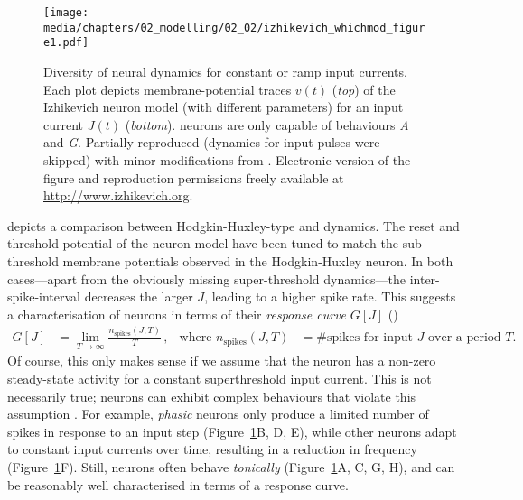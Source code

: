 \begin{figure}
	\centering
	\texttt{[image: media/chapters/02\_modelling/02\_02/izhikevich\_whichmod\_figure1.pdf]}%
	{\label{fig:izhikevich_whichmod_figure1a}}%
	{\label{fig:izhikevich_whichmod_figure1b}}%
	{\label{fig:izhikevich_whichmod_figure1c}}%
	{\label{fig:izhikevich_whichmod_figure1d}}%
	{\label{fig:izhikevich_whichmod_figure1e}}%
	{\label{fig:izhikevich_whichmod_figure1f}}%
	{\label{fig:izhikevich_whichmod_figure1g}}%
	{\label{fig:izhikevich_whichmod_figure1h}}%
	\caption[Diversity of neural dynamics for constant or ramp input currents]{Diversity of neural dynamics for constant or ramp input currents. Each plot depicts membrane-potential traces $v(t)$ (\emph{top}) of the Izhikevich neuron model (with different parameters) for an input current $J(t)$ (\emph{bottom}). \LIF neurons are only capable of behaviours \emph{A} and \emph{G}. Partially reproduced (dynamics for input pulses were skipped) with minor modifications from \citet{izhikevich2004which}. Electronic version of the figure and reproduction permissions freely available at \url{http://www.izhikevich.org}.}
	\label{fig:izhikevich_whichmod_figure1}
\end{figure}

 depicts a comparison between Hodgkin-Huxley-type and \LIF dynamics.
The reset and threshold potential of the \LIF neuron model have been tuned to match the sub-threshold membrane potentials observed in the Hodgkin-Huxley neuron.
In both cases---apart from the obviously missing super-threshold dynamics---the inter-spike-interval decreases the larger $J$, leading to a higher spike rate.
This suggests a characterisation of neurons in terms of their \emph{response curve} $G[J]$ ()
\begin{align}
	G[J] &= \lim_{T \to \infty} \frac{n_\mathrm{spikes}(J, T)}{T} \,, & \text{where } n_\mathrm{spikes}(J, T) &= \text{\#spikes for input $J$ over a period $T$.}
	\label{eqn:response_curve}
\end{align}
Of course, this only makes sense if we assume that the neuron has a non-zero steady-state activity for a constant superthreshold input current.
This is not necessarily true; neurons can exhibit complex behaviours that violate this assumption \citep{izhikevich2004which}.
For example, \emph{phasic} neurons only produce a limited number of spikes in response to an input step (Figure~\ref{fig:izhikevich_whichmod_figure1}B, D, E), while other neurons adapt to constant input currents over time, resulting in a reduction in frequency (Figure~\ref{fig:izhikevich_whichmod_figure1}F).
Still, neurons often behave \emph{tonically} (Figure~\ref{fig:izhikevich_whichmod_figure1}A, C, G, H), and can be reasonably well characterised in terms of a response curve.

